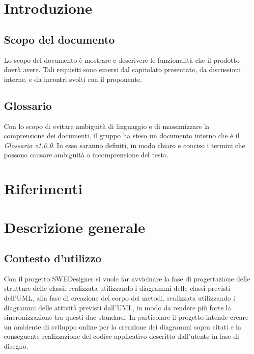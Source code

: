 \section{Introduzione}
\subsection{Scopo del documento}
Lo scopo del documento è mostrare e descrivere le funzionalità che il prodotto dovrà avere. Tali requisiti sono emersi dal capitolato presentato, da discussioni interne, e da incontri svolti con il proponente.

\subsection{Glossario}
          Con lo scopo di evitare ambiguità di linguaggio e di massimizzare la comprensione dei documenti, il
          gruppo ha steso un documento interno che è il \emph{Glossario v1.0.0}. In esso saranno definiti, in modo
          chiaro e conciso i termini che possono causare ambiguità o incomprensione del testo.
          
\section{Riferimenti}

\section{Descrizione generale}
\subsection{Contesto d'utilizzo}
Con il progetto SWEDesigner si vuole far avvicinare la fase di progettazione delle strutture delle classi, realizzata utilizzando i diagrammi delle classi previsti dell'UML, alla fase di creazione del corpo dei metodi, realizzata utilizzando i diagrammi delle attività previsti dall'UML, in modo da  rendere più forte la sincronizzazione tra questi due standard. In particolare il progetto intende creare un ambiente di sviluppo online per la creazione dei diagrammi sopra citati e la conseguente realizzazione del codice applicativo descritto dall'utente in fase di disegno.
 
